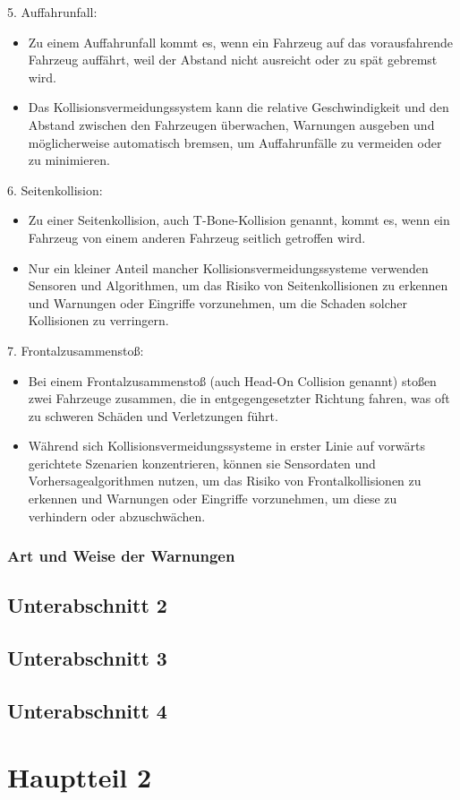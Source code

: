 5. Auffahrunfall:
\begin{itemize}
	\item Zu einem Auffahrunfall kommt es, wenn ein Fahrzeug auf das vorausfahrende Fahrzeug auffährt, weil der Abstand nicht ausreicht oder zu spät gebremst wird.
	\item Das Kollisionsvermeidungssystem kann die relative Geschwindigkeit und den Abstand zwischen den Fahrzeugen überwachen, Warnungen ausgeben und möglicherweise automatisch bremsen, um Auffahrunfälle zu vermeiden oder zu minimieren.
\end{itemize}
6. Seitenkollision:
\begin{itemize}
	\item Zu einer Seitenkollision, auch T-Bone-Kollision genannt, kommt es, wenn ein Fahrzeug von einem anderen Fahrzeug seitlich getroffen wird.
	\item Nur ein kleiner Anteil mancher Kollisionsvermeidungssysteme verwenden Sensoren und Algorithmen, um das Risiko von Seitenkollisionen zu erkennen und Warnungen oder Eingriffe vorzunehmen, um die Schaden solcher Kollisionen zu verringern.
\end{itemize}
7. Frontalzusammenstoß:
\begin{itemize}
	\item Bei einem Frontalzusammenstoß (auch Head-On Collision genannt) stoßen zwei Fahrzeuge zusammen, die in entgegengesetzter Richtung fahren, was oft zu schweren Schäden und Verletzungen führt.
	\item Während sich Kollisionsvermeidungssysteme in erster Linie auf vorwärts gerichtete Szenarien konzentrieren, können sie Sensordaten und Vorhersagealgorithmen nutzen, um das Risiko von Frontalkollisionen zu erkennen und Warnungen oder Eingriffe vorzunehmen, um diese zu verhindern oder abzuschwächen.
\end{itemize}


\subsubsection{Art und Weise der Warnungen}


\subsection{Unterabschnitt 2}

\subsection{Unterabschnitt 3}

\subsection{Unterabschnitt 4}


\section{Hauptteil 2}
